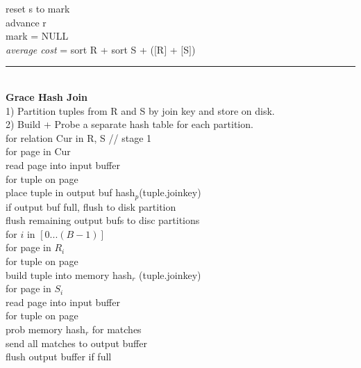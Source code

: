 \documentclass[10pt,landscape]{article}
\newcommand{\ruler}{\\\rule{\columnwidth}{0.25pt}\\}
\begin{document}
\begin{multicols*}{3}
\-\hspace{0.5cm} reset s to mark\\
\-\hspace{0.5cm} advance r\\
\-\hspace{0.5cm} mark = NULL\\
\textit{average cost} = sort R + sort S + ($[$R$]$ + $[$S$]$)
\ruler
\textbf{Grace Hash Join}\\
1) Partition tuples from R and S by join key and store on disk.\\
2) Build + Probe a separate hash table for each partition.\\
for relation Cur in {R, S} // stage 1\\ 
\-\hspace{0.5cm} for page in Cur\\
\-\hspace{1.0cm} read page into input buffer\\
\-\hspace{1.0cm} for tuple on page\\
\-\hspace{1.5cm} place tuple in output buf hash$_p$(tuple.joinkey)\\
\-\hspace{1.5cm} if output buf full, flush to disk partition\\
\-\hspace{0.5cm} flush remaining output bufs to disc partitions\\
for $i$ in $[0...(B-1)]$\\
\-\hspace{0.5cm} for page in $R_i$\\
\-\hspace{1.0cm} for tuple on page\\
\-\hspace{1.5cm} build tuple into memory hash$_r$ (tuple.joinkey)\\
\-\hspace{0.5cm} for page in $S_i$\\
\-\hspace{1.0cm} read page into input buffer\\
\-\hspace{1.0cm} for tuple on page\\
\-\hspace{1.5cm} prob memory hash$_r$ for matches\\
\-\hspace{1.5cm} send all matches to output buffer\\
\-\hspace{1.5cm} flush output buffer if full\\


\end{multicols*}
\end{document}
